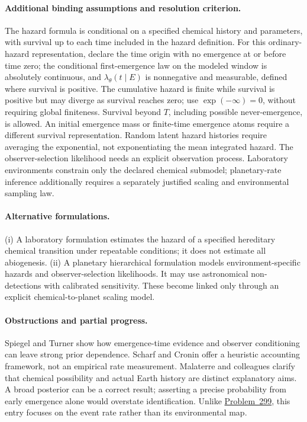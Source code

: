 \documentclass[11pt]{article}
\begin{document}
\paragraph{Additional binding assumptions and resolution criterion.} The hazard formula is conditional on a specified chemical history and parameters, with survival up to each time included in the hazard definition. For this ordinary-hazard representation, declare the time origin with no emergence at or before time zero; the conditional first-emergence law on the modeled window is absolutely continuous, and $\lambda_\theta(t\mid E)$ is nonnegative and measurable, defined where survival is positive. The cumulative hazard is finite while survival is positive but may diverge as survival reaches zero; use $\exp(-\infty)=0$, without requiring global finiteness. Survival beyond $T$, including possible never-emergence, is allowed. An initial emergence mass or finite-time emergence atoms require a different survival representation. Random latent hazard histories require averaging the exponential, not exponentiating the mean integrated hazard. The observer-selection likelihood needs an explicit observation process. Laboratory environments constrain only the declared chemical submodel; planetary-rate inference additionally requires a separately justified scaling and environmental sampling law.

\paragraph{Alternative formulations.} (i) A laboratory formulation estimates the hazard of a specified hereditary chemical transition under repeatable conditions; it does not estimate all abiogenesis. (ii) A planetary hierarchical formulation models environment-specific hazards and observer-selection likelihoods. It may use astronomical non-detections with calibrated sensitivity. These become linked only through an explicit chemical-to-planet scaling model.

\paragraph{Obstructions and partial progress.} Spiegel and Turner show how emergence-time evidence and observer conditioning can leave strong prior dependence. Scharf and Cronin offer a heuristic accounting framework, not an empirical rate measurement. Malaterre and colleagues clarify that chemical possibility and actual Earth history are distinct explanatory aims. A broad posterior can be a correct result; asserting a precise probability from early emergence alone would overstate identification. Unlike \href{https://we-solve.github.io/problems/identifiability-of-a-planetary-habitability-to-abiogenesis-map-4451722b/}{Problem~299}, this entry focuses on the event rate rather than its environmental map.
\end{document}
